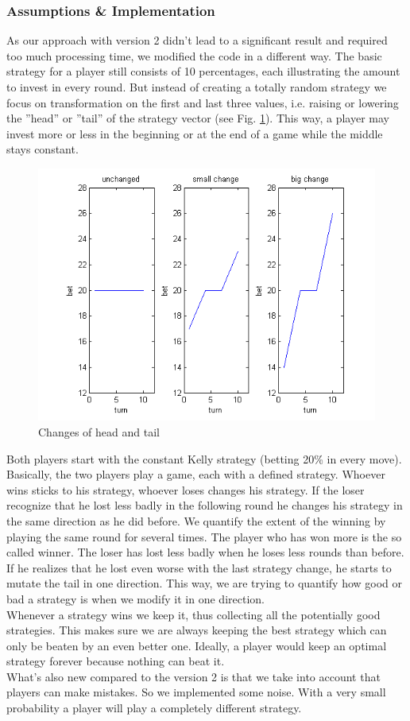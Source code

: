 \documentclass[11pt]{article}
\begin{document}
\subsubsection{Assumptions \& Implementation}
As our approach with version 2 didn’t lead to a significant result and required too much processing time, we modified the code in a different way. The basic strategy for a player still consists of 10 percentages, each illustrating the amount to invest in every round. But instead of creating a totally random strategy we focus on transformation on the first and last three values, i.e. raising or lowering the ''head'' or ''tail'' of the strategy vector (see Fig. \ref{head tail changes}). This way, a player may invest more or less in the beginning or at the end of a game while the middle stays constant.
\begin{figure}[h]
	\includegraphics[scale=0.5]{head_tail_changes.png}
	\centering
	\caption{Changes of head and tail}
	\label{head tail changes}
\end{figure}
Both players start with the constant Kelly strategy (betting 20\% in every move). Basically, the two players play a game, each with a defined strategy. Whoever wins sticks to his strategy, whoever loses changes his strategy. If the loser recognize that he lost less badly in the following round he changes his strategy in the same direction as he did before. We quantify the extent of the winning by playing the same round for several times. The player who has won more is the so called winner. The loser has lost less badly when he loses less rounds than before. If he realizes that he lost even worse with the last strategy change, he starts to mutate the tail in one direction. This way, we are trying to quantify how good or bad a strategy is when we modify it in one direction.\\
Whenever a strategy wins we keep it, thus collecting all the potentially good strategies. This makes sure we are always keeping the best strategy which can only be beaten by an even better one. Ideally, a player would keep an optimal strategy forever because nothing can beat it.\\
What's also new compared to the version 2 is that we take into account that players can make mistakes. So we implemented some noise. With a very small probability a player will play a completely different strategy.
\end{document}
